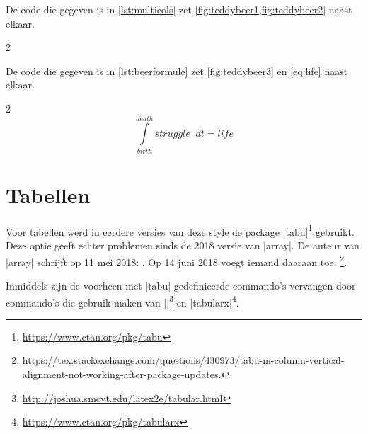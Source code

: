 De code die gegeven is in \cref{lst:multicols} zet \cref{fig:teddybeer1,fig:teddybeer2} naast elkaar.


\begin{multicols}{2}
	\columnbreak
\end{multicols}

De code die gegeven is in \cref{lst:beerformule} zet \cref{fig:teddybeer3} en \cref{eq:life} naast elkaar.


\begin{multicols}{2}
	\columnbreak
	\vspace*{1cm}
	\begin{equation}\label{eq:life}
		\int\limits_{birth}^{death} struggle\;\;dt=life
	\end{equation}
\end{multicols}

\section{Tabellen}
\label{sec:tabellen}
Voor tabellen werd in eerdere versies van deze style de package |tabu|\footnote{\url{https://www.ctan.org/pkg/tabu}} gebruikt.
Deze optie geeft echter problemen sinds de 2018 versie van |array|. De auteur van |array| schrijft op 11 mei 2018: . Op 14 juni 2018 voegt iemand daaraan toe: \footnote{
	\url{https://tex.stackexchange.com/questions/430973/tabu-m-column-vertical-alignment-not-working-after-package-updates}.
}.

Inmiddels zijn de voorheen met |tabu| gedefinieerde commando's vervangen door commando's die gebruik maken van |\tabular|\footnote{\url{http://joshua.smcvt.edu/latex2e/tabular.html}} en |tabularx|\footnote{\url{https://www.ctan.org/pkg/tabularx}}.

